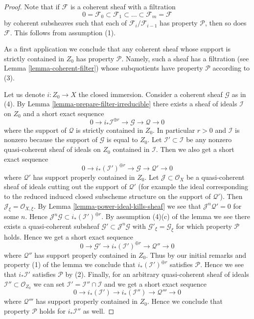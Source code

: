 \begin{proof}
Note that if $\mathcal{F}$ is a coherent sheaf with a filtration
$$
0 = \mathcal{F}_0 \subset \mathcal{F}_1 \subset
\ldots \subset \mathcal{F}_m = \mathcal{F}
$$
by coherent subsheaves such that each of $\mathcal{F}_i/\mathcal{F}_{i - 1}$
has property $\mathcal{P}$, then so does $\mathcal{F}$.
This follows from assumption (1).

\medskip\noindent
As a first application we conclude that any coherent sheaf whose support
is strictly contained in $Z_0$ has property $\mathcal{P}$. Namely, such a
sheaf has a filtration (see Lemma \ref{lemma-coherent-filter})
whose subquotients have property $\mathcal{P}$ according to (3).

\medskip\noindent
Let us denote $i : Z_0 \to X$ the closed immersion.
Consider a coherent sheaf $\mathcal{G}$ as in (4).
By Lemma \ref{lemma-prepare-filter-irreducible}
there exists a sheaf of ideals $\mathcal{I}$ on $Z_0$ and
a short exact sequence
$$
0 \to
i_*\mathcal{I}^{\oplus r} \to
\mathcal{G} \to
\mathcal{Q} \to 0
$$
where the support of $\mathcal{Q}$ is strictly contained in $Z_0$.
In particular $r > 0$ and $\mathcal{I}$ is nonzero
because the support of $\mathcal{G}$ is equal to $Z_0$.
Let $\mathcal{I}' \subset \mathcal{I}$ be any nonzero quasi-coherent
sheaf of ideals on $Z_0$ contained in $\mathcal{I}$.
Then we also get a short exact sequence
$$
0 \to
i_*(\mathcal{I}')^{\oplus r} \to
\mathcal{G} \to
\mathcal{Q}' \to 0
$$
where $\mathcal{Q}'$ has support properly contained in $Z_0$.
Let $\mathcal{J} \subset \mathcal{O}_X$ be a quasi-coherent sheaf
of ideals cutting out the support of $\mathcal{Q}'$ (for example
the ideal corresponding to the reduced induced closed subscheme
structure on the support of $\mathcal{Q}'$). Then
$\mathcal{J}_\xi = \mathcal{O}_{X, \xi}$. By
Lemma \ref{lemma-power-ideal-kills-sheaf}
we see that $\mathcal{J}^n\mathcal{Q}' = 0$ for some $n$.
Hence $\mathcal{J}^n\mathcal{G} \subset i_*(\mathcal{I}')^{\oplus r}$.
By assumption (4)(c) of the lemma we see there exists
a quasi-coherent subsheaf $\mathcal{G}' \subset \mathcal{J}^n\mathcal{G}$
with $\mathcal{G}'_\xi = \mathcal{G}_\xi$
for which property $\mathcal{P}$ holds.
Hence we get a short exact sequence
$$
0 \to \mathcal{G}' \to
i_*(\mathcal{I}')^{\oplus r} \to
\mathcal{Q}'' \to 0
$$
where $\mathcal{Q}''$ has support properly contained in $Z_0$.
Thus by our initial remarks and property (1) of the lemma
we conclude that $i_*(\mathcal{I}')^{\oplus r}$ satisfies
$\mathcal{P}$. Hence we see that $i_*\mathcal{I}'$ satisfies
$\mathcal{P}$ by (2). Finally, for an arbitrary quasi-coherent
sheaf of ideals $\mathcal{I}'' \subset \mathcal{O}_{Z_0}$ we can set
$\mathcal{I}' = \mathcal{I}'' \cap \mathcal{I}$ and we get
a short exact sequence
$$
0 \to
i_*(\mathcal{I}') \to
i_*(\mathcal{I}'') \to
\mathcal{Q}''' \to 0
$$
where $\mathcal{Q}'''$ has support properly contained in $Z_0$.
Hence we conclude that property $\mathcal{P}$ holds for
$i_*\mathcal{I}''$ as well.


\end{proof}
